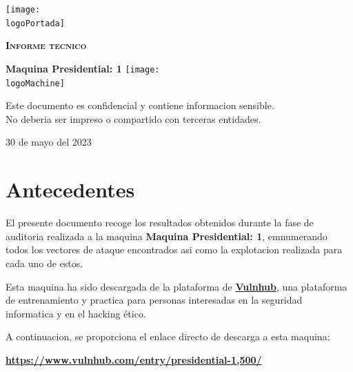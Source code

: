 \documentclass[a4paper]{article} %
\newcommand{\logoPortada}{vulnhub.png}
\newcommand{\machineName}{Maquina Presidential: 1}
\newcommand{\logoMachine}{casablanca.png}
\newcommand{\startDate}{30 de mayo del 2023}
\begin{document}
  \cfoot{\thepage} %
  \begin{titlepage}
    \centering
      \texttt{[image: \\logoPortada]}\par\vspace{1cm}
      {\scshape\LARGE \textbf{Informe tecnico}}\par\vspace{0.4cm}
      {\Huge\textcolor{bluePortada}{\textbf{\machineName}}}
      \vfill\vfill
      \texttt{[image: \\logoMachine]}
      \vfill
      \begin{tcolorbox}[colback=red!5!white,colframe=red!75!black]
        \centering
          Este documento es confidencial y contiene informacion sensible.\\No deberia ser impreso o compartido con terceras entidades.
      \end{tcolorbox}
      \vfill
      {\large \startDate}
      \vfill
  \end{titlepage}

  \clearpage
  \tableofcontents
  \clearpage

  \section{Antecedentes}

  El presente documento recoge los resultados obtenidos durante la fase de auditoria realizada a la maquina \textbf{\machineName}, emnumerando todos los vectores de ataque encontrados asi como la explotacion realizada para cada uno de estos.

  Esta maquina ha sido descargada de la plataforma de \href{https://vulnhub.com}{\textbf{\color{bluePortada}Vulnhub}}, una plataforma de entrenamiento y practica para personas interesadas en la seguridad informatica y en el hacking ético.

  A continuacion, se proporciona el enlace directo de descarga a esta maquina:

  \vspace{0.2cm}


  \begin{tcolorbox}[enhanced,attach boxed title to top center={yshift=-3mm,yshifttext=-1mm},
  colback=blue!5!white,colframe=blue!75!black,colbacktitle=bluePortada!80!black,
  title=Direccion URL,fonttitle=\bfseries,
  boxed title style={size=small,colframe=red!50!black} ]
  \centering 
    \href{https://www.vulnhub.com/entry/presidential-1,500/}{\textbf{\color{bluePortada}https://www.vulnhub.com/entry/presidential-1,500/}}
  \end{tcolorbox} 
    
\end{document}
